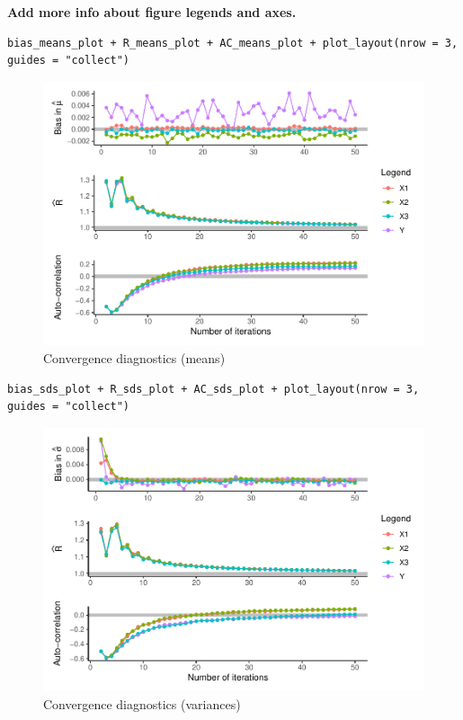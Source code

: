 \documentclass[Royal,times,sageh]{sagej}
\begin{document}
\textbf{Add more info about figure legends and axes.}

\begin{verbatim}
bias_means_plot + R_means_plot + AC_means_plot + plot_layout(nrow = 3, guides = "collect")
\end{verbatim}

\begin{figure}
\centering
\includegraphics{manuscript_files/figure-latex/unnamed-chunk-2-1.pdf}
\caption{Convergence diagnostics (means)}
\end{figure}

\begin{verbatim}
bias_sds_plot + R_sds_plot + AC_sds_plot + plot_layout(nrow = 3, guides = "collect")
\end{verbatim}

\begin{figure}
\centering
\includegraphics{manuscript_files/figure-latex/unnamed-chunk-3-1.pdf}
\caption{Convergence diagnostics (variances)}
\end{figure}
\end{document}
